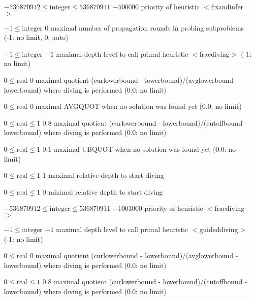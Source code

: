 %
{$-536870912\leq\textrm{integer}\leq536870911$}%
{$-500000$}%
{priority of heuristic $<$fixandinfer$>$}%
{}

%
{$-1\leq\textrm{integer}$}%
{$0$}%
{maximal number of propagation rounds in probing subproblems (-1: no limit, 0: auto)}%
{}

%
{$-1\leq\textrm{integer}$}%
{$-1$}%
{maximal depth level to call primal heuristic $<$fracdiving$>$ (-1: no limit)}%
{}

%
{$0\leq\textrm{real}$}%
{$0$}%
{maximal quotient (curlowerbound - lowerbound)/(avglowerbound - lowerbound) where diving is performed (0.0: no limit)}%
{}

%
{$0\leq\textrm{real}$}%
{$0$}%
{maximal AVGQUOT when no solution was found yet (0.0: no limit)}%
{}

%
{$0\leq\textrm{real}\leq1$}%
{$0.8$}%
{maximal quotient (curlowerbound - lowerbound)/(cutoffbound - lowerbound) where diving is performed (0.0: no limit)}%
{}

%
{$0\leq\textrm{real}\leq1$}%
{$0.1$}%
{maximal UBQUOT when no solution was found yet (0.0: no limit)}%
{}

%
{$0\leq\textrm{real}\leq1$}%
{$1$}%
{maximal relative depth to start diving}%
{}

%
{$0\leq\textrm{real}\leq1$}%
{$0$}%
{minimal relative depth to start diving}%
{}

%
{$-536870912\leq\textrm{integer}\leq536870911$}%
{$-1003000$}%
{priority of heuristic $<$fracdiving$>$}%
{}

%
{$-1\leq\textrm{integer}$}%
{$-1$}%
{maximal depth level to call primal heuristic $<$guideddiving$>$ (-1: no limit)}%
{}

%
{$0\leq\textrm{real}$}%
{$0$}%
{maximal quotient (curlowerbound - lowerbound)/(avglowerbound - lowerbound) where diving is performed (0.0: no limit)}%
{}

%
{$0\leq\textrm{real}\leq1$}%
{$0.8$}%
{maximal quotient (curlowerbound - lowerbound)/(cutoffbound - lowerbound) where diving is performed (0.0: no limit)}%
{}


